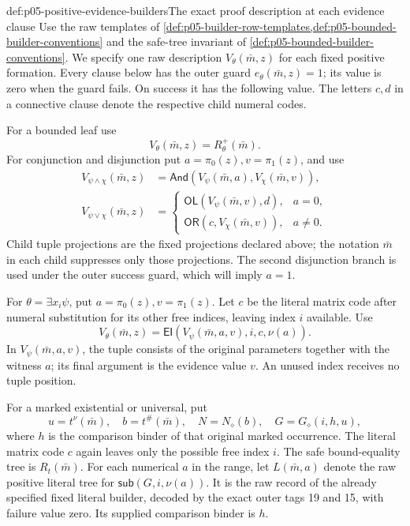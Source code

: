 \begin{hbdefinition}{def:p05-positive-evidence-builders}{The exact proof description at each evidence clause}
Use the raw templates of
\cref{def:p05-builder-row-templates,def:p05-bounded-builder-conventions}
and the safe-tree invariant of
\cref{def:p05-bounded-builder-conventions}. We specify one raw description
\(V_\theta(\bar m,z)\) for each fixed positive formation. Every clause
below has the outer guard \(e_\theta(\bar m,z)=1\); its value is zero
when the guard fails. On success it has the following value. The letters
\(c,d\) in a connective clause denote the respective child numeral codes.

For a bounded leaf use
\[
                  V_\theta(\bar m,z)=R_\theta^+(\bar m).
\]
For conjunction and disjunction put \(a=\pi_0(z),v=\pi_1(z)\), and use
\[
\begin{aligned}
 V_{\psi\land\chi}(\bar m,z)
   &=\mathsf{And}(V_\psi(\bar m,a),V_\chi(\bar m,v)),\\
 V_{\psi\lor\chi}(\bar m,z)
   &=\begin{cases}
       \mathsf{OL}(V_\psi(\bar m,v),d),&a=0,\\
       \mathsf{OR}(c,V_\chi(\bar m,v)),&a\ne0.
     \end{cases}
\end{aligned}
\]
Child tuple projections are the fixed projections declared above; the
notation \(\bar m\) in each child suppresses only those projections.
The second disjunction branch is used under the outer success guard,
which will imply \(a=1\).

For \(\theta=\exists x_i\psi\), put \(a=\pi_0(z),v=\pi_1(z)\).
Let \(c\) be the literal matrix code after numeral substitution for its
other free indices, leaving index \(i\) available. Use
\[
 V_\theta(\bar m,z)=
          \mathsf{EI}(V_\psi(\bar m,a,v),i,c,\nu(a)).
\]
In \(V_\psi(\bar m,a,v)\), the tuple consists of the original
parameters together with the witness \(a\); its final argument is the
evidence value \(v\). An unused index receives no tuple position.

For a marked existential or universal, put
\[
 u=t^\nu(\bar m),\quad b=t^\#(\bar m),\quad
 N=N_\diamond(b),\quad G=G_\diamond(i,h,u),
\]
where \(h\) is the comparison binder of that original marked occurrence.
The literal matrix code \(c\) again leaves only the possible free index
\(i\). The safe bound-equality tree is \(R_t(\bar m)\).
For each numerical \(a\) in the range, let \(L(\bar m,a)\) denote
the raw positive literal tree for
\(\mathsf{sub}(G,i,\nu(a))\). It is the raw record of the already
specified fixed literal builder, decoded by the exact outer tags 19 and
15, with failure value zero. Its supplied comparison binder is \(h\).


\end{hbdefinition}
